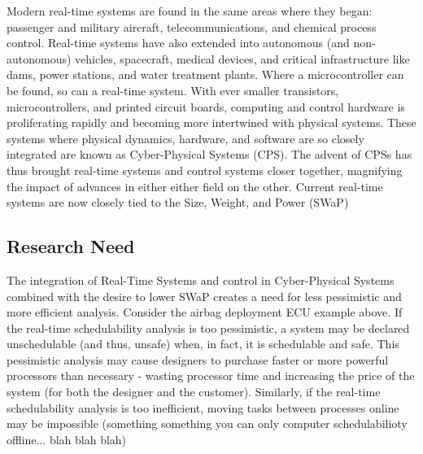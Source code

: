 Modern real-time systems are found in the same areas where they began: passenger and military aircraft, telecommunications, and chemical process control.
Real-time systems have also extended into autonomous (and non-autonomous) vehicles, spacecraft, medical devices, and critical infrastructure like dams, power stations, and water treatment plants.
Where a microcontroller can be found, so can a real-time system.
With ever smaller transistors, microcontrollers, and printed circuit boards, computing and control hardware is proliferating rapidly and becoming more intertwined with physical systems.
These systems where physical dynamics, hardware, and software are so closely integrated are known as Cyber-Physical Systems (CPS).
The advent of CPSs has thus brought real-time systems and control systems closer together, magnifying the impact of advances in either either field on the other.
Current real-time systems are now closely tied to the Size, Weight, and Power (SWaP)


\subsection{Research Need}
The integration of Real-Time Systems and control in Cyber-Physical Systems combined with the desire to lower SWaP creates a need for less pessimistic and more efficient analysis.
Consider the airbag deployment ECU example above.
If the real-time schedulability analysis is too pessimistic, a system may be declared unschedulable (and thus, unsafe) when, in fact, it is schedulable and safe.
This pessimistic analysis may cause designers to purchase faster or more powerful processors than necessary - wasting processor time and increasing the price of the system (for both the designer and the customer).
Similarly, if the real-time schedulability analysis is too inefficient, moving tasks between processes online may be impossible (something something you can only computer schedulabilioty offline... blah blah blah)

